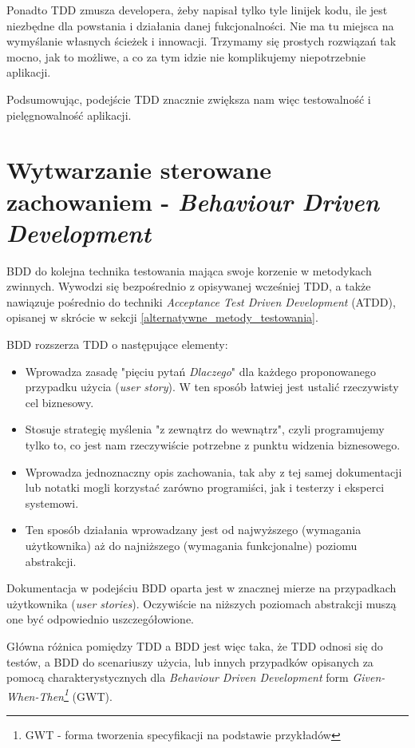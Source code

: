 Ponadto TDD zmusza developera, żeby napisał tylko tyle linijek kodu, ile jest niezbędne dla powstania i działania danej fukcjonalności. Nie ma tu miejsca na wymyślanie własnych ścieżek i innowacji. Trzymamy się prostych rozwiązań tak mocno, jak to możliwe, a co za tym idzie nie komplikujemy niepotrzebnie aplikacji.

Podsumowując, podejście TDD znacznie zwiększa nam więc testowalność i pielęgnowalność aplikacji. 

\section{Wytwarzanie sterowane zachowaniem - \textit{Behaviour Driven Development}}
\label{behaviour_driven_development}
BDD do kolejna technika testowania mająca swoje korzenie w metodykach zwinnych. Wywodzi się bezpośrednio z opisywanej wcześniej TDD, a także  nawiązuje pośrednio do techniki \textit{Acceptance Test Driven Development} (ATDD), opisanej w skrócie w sekcji \ref{alternatywne_metody_testowania}.

BDD rozszerza TDD o następujące elementy:
\begin{itemize}
\item
Wprowadza zasadę "pięciu pytań \textit{Dlaczego}" dla każdego proponowanego przypadku użycia (\textit{user story}). W ten sposób łatwiej jest ustalić rzeczywisty cel biznesowy.

\item
Stosuje strategię myślenia "z zewnątrz do wewnątrz", czyli programujemy tylko to, co jest nam rzeczywiście potrzebne z punktu widzenia biznesowego.

\item
Wprowadza jednoznaczny opis zachowania, tak aby z tej samej dokumentacji lub notatki mogli korzystać zarówno programiści, jak i testerzy i eksperci systemowi.

\item
Ten sposób działania wprowadzany jest od najwyższego (wymagania użytkownika) aż do najniższego (wymagania funkcjonalne) poziomu abstrakcji.

\end{itemize}

Dokumentacja w podejściu BDD oparta jest w znacznej mierze na przypadkach użytkownika (\textit{user stories}). Oczywiście na niższych poziomach abstrakcji muszą one być odpowiednio uszczegółowione.

Główna różnica pomiędzy TDD a BDD jest więc taka, że TDD odnosi się do testów, a BDD do scenariuszy użycia, lub innych przypadków opisanych za pomocą charakterystycznych dla \textit{Behaviour Driven Development} form \textit{Given-When-Then\footnote{GWT - forma tworzenia specyfikacji na podstawie przykładów}} (GWT).

